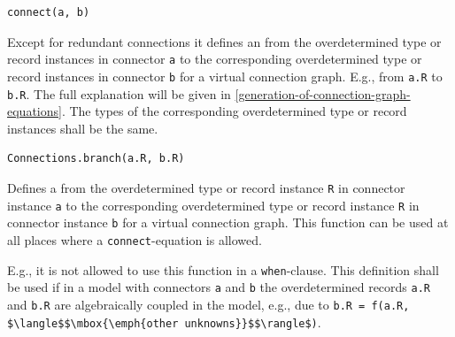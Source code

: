 \begin{operatordefinition*}[connect]\label{modelica:optional-spanning-tree-edge}
\begin{synopsis}\begin{lstlisting}
connect(a, b)
\end{lstlisting}\end{synopsis}
\begin{semantics}
Except for redundant connections it defines an  from the overdetermined type or record instances in connector \lstinline!a! to the corresponding overdetermined type or record instances in connector \lstinline!b! for a virtual connection graph.
E.g., from \lstinline!a.R! to \lstinline!b.R!.
The full explanation will be given in \cref{generation-of-connection-graph-equations}.
The types of the corresponding overdetermined type or record instances shall be the same.
\end{semantics}
\end{operatordefinition*}

\begin{operatordefinition}
\begin{synopsis}\begin{lstlisting}
Connections.branch(a.R, b.R)
\end{lstlisting}\end{synopsis}
\begin{semantics}
Defines a  from the overdetermined type or record instance \lstinline!R! in connector instance \lstinline!a! to the corresponding overdetermined type or record instance \lstinline!R! in connector instance \lstinline!b! for a virtual connection graph.
This function can be used at all places where a \lstinline!connect!-equation is allowed.

\begin{nonnormative}
E.g., it is not allowed to use this function in a \lstinline!when!-clause.
This definition shall be used if in a model with connectors \lstinline!a! and \lstinline!b! the overdetermined records \lstinline!a.R! and \lstinline!b.R! are algebraically coupled in the model, e.g., due to \lstinline!b.R = f(a.R, $\langle$$\mbox{\emph{other unknowns}}$$\rangle$)!.
\end{nonnormative}
\end{semantics}
\end{operatordefinition}


